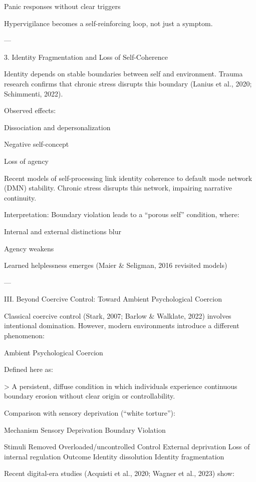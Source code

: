 Panic responses without clear triggers


Hypervigilance becomes a self-reinforcing loop, not just a symptom.


---

3. Identity Fragmentation and Loss of Self-Coherence

Identity depends on stable boundaries between self and environment. Trauma research confirms that chronic stress disrupts this boundary (Lanius et al., 2020; Schimmenti, 2022).

Observed effects:

Dissociation and depersonalization

Negative self-concept

Loss of agency


Recent models of self-processing link identity coherence to default mode network (DMN) stability. Chronic stress disrupts this network, impairing narrative continuity.

Interpretation:
Boundary violation leads to a “porous self” condition, where:

Internal and external distinctions blur

Agency weakens

Learned helplessness emerges (Maier & Seligman, 2016 revisited models)



---

III. Beyond Coercive Control: Toward Ambient Psychological Coercion

Classical coercive control (Stark, 2007; Barlow & Walklate, 2022) involves intentional domination. However, modern environments introduce a different phenomenon:

Ambient Psychological Coercion

Defined here as:

> A persistent, diffuse condition in which individuals experience continuous boundary erosion without clear origin or controllability.



Comparison with sensory deprivation (“white torture”):

Mechanism Sensory Deprivation Boundary Violation

Stimuli Removed Overloaded/uncontrolled
Control External deprivation Loss of internal regulation
Outcome Identity dissolution Identity fragmentation


Recent digital-era studies (Acquisti et al., 2020; Wagner et al., 2023) show:

